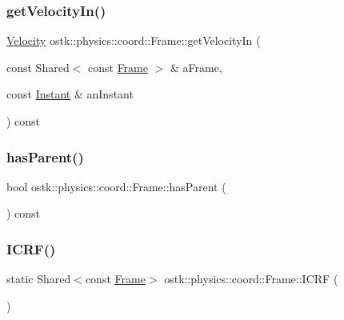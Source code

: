 \subsubsection{\texorpdfstring{get\+Velocity\+In()}{getVelocityIn()}}
{\footnotesize\ttfamily \hyperlink{classostk_1_1physics_1_1coord_1_1_velocity}{Velocity} ostk\+::physics\+::coord\+::\+Frame\+::get\+Velocity\+In (\begin{DoxyParamCaption}\item[{const Shared$<$ const \hyperlink{classostk_1_1physics_1_1coord_1_1_frame}{Frame} $>$ \&}]{a\+Frame,  }\item[{const \hyperlink{classostk_1_1physics_1_1time_1_1_instant}{Instant} \&}]{an\+Instant }\end{DoxyParamCaption}) const}

\mbox{\label{classostk_1_1physics_1_1coord_1_1_frame_aa4c778fa91e6599cdea0a889fd5bf69c}} 
\subsubsection{\texorpdfstring{has\+Parent()}{hasParent()}}
{\footnotesize\ttfamily bool ostk\+::physics\+::coord\+::\+Frame\+::has\+Parent (\begin{DoxyParamCaption}{ }\end{DoxyParamCaption}) const}

\mbox{\label{classostk_1_1physics_1_1coord_1_1_frame_af111d96da6adf5405a354a769618b5f4}} 
\subsubsection{\texorpdfstring{I\+C\+R\+F()}{ICRF()}}
{\footnotesize\ttfamily static Shared$<$const \hyperlink{classostk_1_1physics_1_1coord_1_1_frame}{Frame}$>$ ostk\+::physics\+::coord\+::\+Frame\+::\+I\+C\+RF (\begin{DoxyParamCaption}{ }\end{DoxyParamCaption})\hspace{0.3cm}{\ttfamily [static]}}

